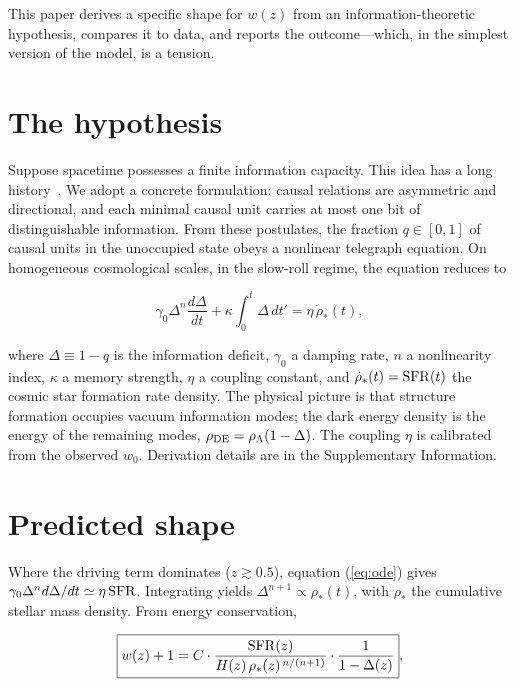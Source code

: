 \documentclass[12pt,a4paper]{article}
\begin{document}
This paper derives a specific shape for $w(z)$ from an information-theoretic hypothesis, compares it to data, and reports the outcome---which, in the simplest version of the model, is a tension.

\section*{The hypothesis}

Suppose spacetime possesses a finite information capacity. This idea has a long history~\cite{thooft1993,susskind1995,sorkin2005,verlinde2011,jacobson1995}. We adopt a concrete formulation: causal relations are asymmetric and directional, and each minimal causal unit carries at most one bit of distinguishable information. From these postulates, the fraction $q\in[0,1]$ of causal units in the unoccupied state obeys a nonlinear telegraph equation. On homogeneous cosmological scales, in the slow-roll regime, the equation reduces to

\begin{equation}\label{eq:ode}
\gamma_0\Delta^n\frac{d\Delta}{dt} + \kappa\int_0^t\Delta\,dt' = \eta\,\dot{\rho}_*(t),
\end{equation}

where $\Delta\equiv1-q$ is the information deficit, $\gamma_0$ a damping rate, $n$ a nonlinearity index, $\kappa$ a memory strength, $\eta$ a coupling constant, and $\dot{\rho}_*(t)={\rm SFR}(t)$ the cosmic star formation rate density. The physical picture is that structure formation occupies vacuum information modes; the dark energy density is the energy of the remaining modes, $\rho_{\rm DE}=\rho_\Lambda(1-\Delta)$. The coupling $\eta$ is calibrated from the observed $w_0$. Derivation details are in the Supplementary Information.

\section*{Predicted shape}

Where the driving term dominates ($z\gtrsim0.5$), equation (\ref{eq:ode}) gives $\gamma_0\Delta^n d\Delta/dt\simeq\eta\,{\rm SFR}$. Integrating yields $\Delta^{n+1}\propto\rho_*(t)$, with $\rho_*$ the cumulative stellar mass density. From energy conservation,

\begin{equation}\label{eq:shape}
\boxed{w(z)+1 = C\cdot\frac{{\rm SFR}(z)}{H(z)\,\rho_*(z)^{\,n/(n+1)}}\cdot\frac{1}{1-\Delta(z)}},
\end{equation}
\end{document}
